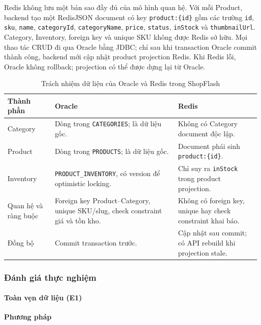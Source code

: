 Redis không lưu một bản sao đầy đủ của mô hình quan hệ. Với mỗi Product, backend tạo một RedisJSON document có key \texttt{product:\{id\}} gồm các trường \texttt{id}, \texttt{sku}, \texttt{name}, \texttt{categoryId}, \texttt{categoryName}, \texttt{price}, \texttt{status}, \texttt{inStock} và \texttt{thumbnailUrl}. Category, Inventory, foreign key và unique SKU không được Redis sở hữu. Mọi thao tác CRUD đi qua Oracle bằng JDBC; chỉ sau khi transaction Oracle commit thành công, backend mới cập nhật product projection Redis. Khi Redis lỗi, Oracle không rollback; projection có thể được dựng lại từ Oracle.

\begin{table}[H]
    \centering
    \caption{Trách nhiệm dữ liệu của Oracle và Redis trong ShopFlash}
    \label{tab:st-storage-model-mapping}
    \begin{tabularx}{\textwidth}{@{}p{}XX@{}}
        \toprule
        Thành phần & Oracle & Redis \\
        \midrule
        Category & Dòng trong \texttt{CATEGORIES}; là dữ liệu gốc. & Không có Category document độc lập. \\
        Product & Dòng trong \texttt{PRODUCTS}; là dữ liệu gốc. & Document phái sinh \texttt{product:\{id\}}. \\
        Inventory & \texttt{PRODUCT\_INVENTORY}, có version để optimistic locking. & Chỉ suy ra \texttt{inStock} trong product projection. \\
        Quan hệ và ràng buộc & Foreign key Product--Category, unique SKU/slug, check constraint giá và tồn kho. & Không có foreign key, unique hay check constraint khai báo. \\
        Đồng bộ & Commit transaction trước. & Cập nhật sau commit; có API rebuild khi projection stale. \\
        \bottomrule
    \end{tabularx}
\end{table}

\subsubsection{Đánh giá thực nghiệm}

\paragraph{Toàn vẹn dữ liệu (E1)}

\noindent\textbf{Phương pháp}\par

